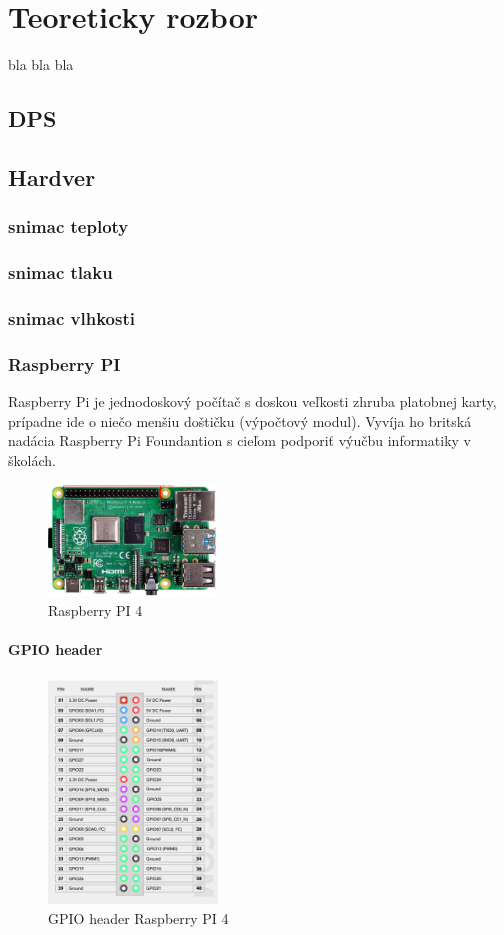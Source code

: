 \chapter{Teoreticky rozbor}
bla bla bla
\section{\acl{DPS}}
\section{Hardver}
\subsection{snimac teploty}
\subsection{snimac tlaku}
\subsection{snimac vlhkosti}
\subsection{Raspberry PI}
Raspberry Pi je jednodoskový počítač s doskou veľkosti zhruba platobnej karty, prípadne ide o niečo menšiu doštičku (výpočtový modul). Vyvíja ho britská nadácia Raspberry Pi Foundantion s cieľom podporiť výučbu informatiky v školách.
\begin{figure}[h!]
    \centering
    \includegraphics[width=0.4\textwidth]{obrazky/RPi.png}
    \caption{Raspberry PI 4}
\end{figure}
\subsubsection{GPIO header}
\begin{figure}[h!]
    \centering
    \includegraphics[width=0.4\textwidth]{obrazky/gpio_header.png}
    \caption{GPIO header Raspberry PI 4}
\end{figure}
